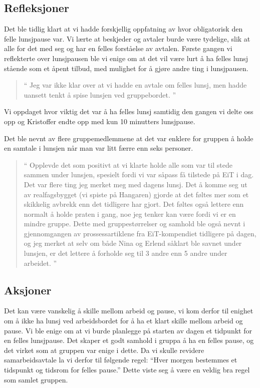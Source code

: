 \subsection*{Refleksjoner}
Det ble tidlig klart at vi hadde forskjellig oppfatning av hvor obligatorisk den felle lunsjpause var. Vi lærte at beskjeder og avtaler burde være tydelige, slik at alle for det med seg og har en felles forståelse av avtalen. Første gangen vi reflekterte over lunsjpausen ble vi enige om at det vil være lurt å ha felles lunsj stående som et åpent tilbud, med mulighet for å gjøre andre ting i lunsjpausen. 

\begin{quote}``
Jeg var ikke klar over at vi hadde en avtale om felles lunsj, men hadde uansett tenkt å spise lunsjen ved gruppebordet.
''\end{quote} 

Vi oppdaget hvor viktig det var å ha felles lunsj samtidig den gangen vi delte oss opp og Kristoffer endte opp med kun 10 minutters lunsjpause. 

Det ble nevnt av flere gruppemedlemmene at det var enklere for gruppen å holde en samtale i lunsjen når man var litt færre enn seks personer. 

\begin{quote}``
Opplevde det som positivt at vi klarte holde alle som var til stede sammen under lunsjen, spesielt fordi vi var såpass få tilstede på EiT i dag. Det var flere ting jeg merket meg med dagens lunsj. Det å komme seg ut av realfagsbygget (vi spiste på Hangaren) gjorde at det føltes mer som et skikkelig avbrekk enn det tidligere har gjort. Det føltes også lettere enn normalt å holde praten i gang, noe jeg tenker kan være fordi vi er en mindre gruppe. Dette med gruppestørrelser og samhold ble også nevnt i gjennomgangen av prossessartiklene fra EiT-kompendiet tidligere på dagen, og jeg merket at selv om både Nina og Erlend såklart ble savnet under lunsjen, er det lettere å forholde seg til 3 andre enn 5 andre under arbeidet.
''\end{quote} 


\subsection*{Aksjoner}
Det kan være vanskelig å skille mellom arbeid og pause, vi kom derfor til enighet om å ikke ha lunsj ved arbeidsbordet for å ha et klart skille mellom arbeid og pause. 
Vi ble enige om at vi burde planlegge på starten av dagen et tidpunkt for en felles lunsjpause. Det skaper et godt samhold i gruppa å ha en felles pause, og det virket som at gruppen var enige i dette.  Da vi skulle revidere samarbeidsavtale la vi derfor til følgende regel:  ``Hver morgen bestemmes et tidspunkt og tidsrom for felles pause.'' Dette viste seg å være en veldig bra regel som samlet gruppen.


